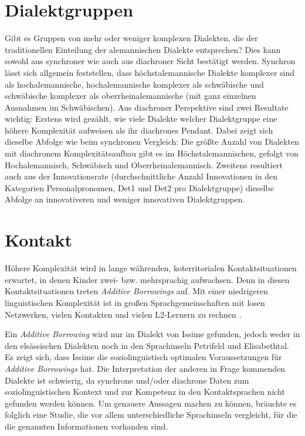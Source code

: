 \section{Dialektgruppen} Gibt es Gruppen von mehr oder weniger komplexen Dialekten, die der traditionellen Einteilung der alemannischen Dialekte entsprechen? Dies kann sowohl aus synchroner wie auch aus diachroner Sicht bestätigt werden. Synchron lässt sich allgemein feststellen, dass höchstalemannische Dialekte komplexer sind als hochalemannische, hochalemannische komplexer als schwäbische und schwäbische komplexer als oberrheinalemannische (mit ganz einzelnen Ausnahmen im Schwäbischen). Aus diachroner Perspektive sind zwei Resultate wichtig: Erstens wird gezählt, wie viele Dialekte welcher Dialektgruppe eine höhere Komplexität aufweisen als ihr diachrones Pendant. Dabei zeigt sich dieselbe Abfolge wie beim synchronen Vergleich: Die größte Anzahl von Dialekten mit diachronem Komplexitätsaufbau gibt es im Höchstalemannischen, gefolgt von Hochalemannisch, Schwäbisch und Oberrheinalemannisch. Zweitens resultiert auch aus der Innovationsrate (durchschnittliche Anzahl Innovationen in den Kategorien Personalpronomen, Det1 und Det2 pro Dialektgruppe) dieselbe Abfolge an innovativeren und weniger innovativen Dialektgruppen.\\

\section{Kontakt} Höhere Komplexität wird in lange währenden, koterritorialen Kontaktsituationen erwartet, in denen Kinder zwei- bzw. mehrsprachig aufwachsen. Denn in diesen Kontaktsituationen treten \textit{Additive Borrowings} auf. Mit einer niedrigeren linguistischen Komplexität ist in großen Sprachgemeinschaften mit losen Netzwerken, vielen Kontakten und vielen L2-Ler\-nern zu rechnen \citep{Trudgill2011}.

Ein \textit{Additive Borrowing} wird nur im Dialekt von Issime gefunden, jedoch weder in den elsässischen Dialekten noch in den Sprachinseln Petrifeld und Elisabethtal. Es zeigt sich, dass Issime die soziolinguistisch optimalen Voraussetzungen für \textit{Additive Borrowings} hat. Die Interpretation der anderen in Frage kommenden Dialekte ist schwierig, da synchrone und/oder diachrone Daten zum soziolinguistischen Kontext und zur Kompetenz in den Kontaktsprachen nicht gefunden werden können. Um genauere Aussagen machen zu können, bräuchte es folglich eine Studie, die vor allem unterschiedliche Sprachinseln vergleicht, für die die genannten Informationen vorhanden sind.

